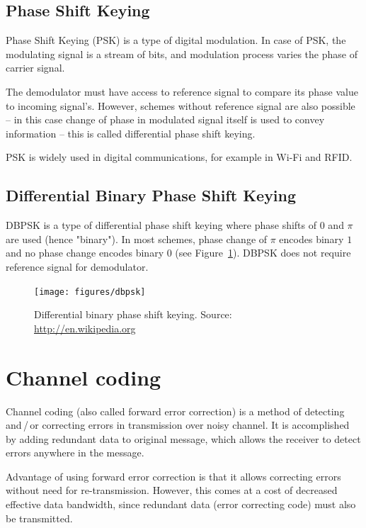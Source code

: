 \documentclass[english,bachelor,a4paper,oneside]{ppfcmthesis}
\begin{document}
\subsection{Phase Shift Keying}

Phase Shift Keying (PSK) is a type of digital modulation. In case of PSK, the modulating signal is a stream of bits, and modulation process varies the phase of carrier signal.

The demodulator must have access to reference signal to compare its phase value to incoming signal's. However, schemes without reference signal are also possible -- in this case
change of phase in modulated signal itself is used to convey information -- this is called differential phase shift keying.

PSK is widely used in digital communications, for example in Wi-Fi and RFID. %

\subsection{Differential Binary Phase Shift Keying}
\label{subsec:dbpsk}

DBPSK is a type of differential phase shift keying where phase shifts of $0$ and $\pi$ are used (hence "binary"). In most schemes, phase change of $\pi$ encodes binary $1$
and no phase change encodes binary $0$ (see Figure~\ref{fig:dbpsk}). DBPSK does not require reference signal for demodulator.

\begin{figure}[h]
  \centering
  \texttt{[image: figures/dbpsk]}
  \caption[Differential binary phase shift keying]{Differential binary phase shift keying. Source: \url{http://en.wikipedia.org}}
  \label{fig:dbpsk}
\end{figure}

\clearpage

\section{Channel coding}

Channel coding (also called forward error correction) is a method of detecting and\,/\,or correcting errors in transmission over noisy channel.
It is accomplished by adding redundant data to original message, which allows the receiver to detect errors anywhere in the message.

Advantage of using forward error correction is that it allows correcting errors without need for re-transmission.
However, this comes at a cost of decreased effective data bandwidth, since redundant data (error correcting code) must also be transmitted.
\end{document}
